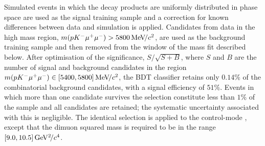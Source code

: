 Simulated \LK events in which the decay products are uniformly distributed in phase space are used as the signal training sample and a correction for known differences between data and simulation is applied.
Candidates from data in the high mass region, $m(p{{K}^-}{\mu^+}{\mu^-})>5800{\mathrm{\,Me\kern -0.1em V\!/}c^2}$, are used as the background training sample and then removed from the window of the mass fit described below. After optimisation of the significance, $S/\sqrt{S+B}$, where $S$ and $B$ are the number of signal and background candidates in the region $m(pK^-\mu^+\mu^-) \in [5400,5800]{\mathrm{\,Me\kern -0.1em V\!/}c^2}$, the BDT classifier retains only $0.14\%$ of the combinatorial background candidates, with a signal efficiency of $51\%$. Events in which more than one \Lb candidate survives the selection constitute less than $1\%$ of the sample and all candidates are retained; the systematic uncertainty associated with this is negligible. The identical selection is applied to the control-mode \LKJ, except that the dimuon squared mass is required to be in the range $[9.0,10.5]{\mathrm{\,Ge\kern -0.1em V^2\!/}c^4}$.